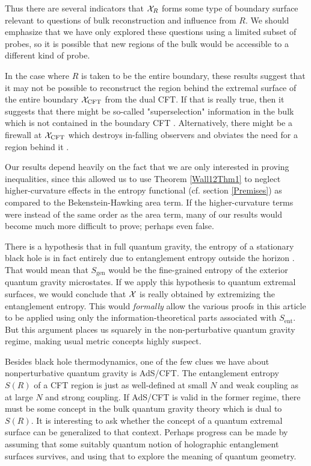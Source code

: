 \documentclass[12pt]{article}
\theoremstyle{remark}
\numberwithin{equation}{section}
\numberwithin{equation}{section}
\begin{document}
Thus there are several indicators that ${\cal X}_R$ forms some type of boundary surface relevant to questions of bulk reconstruction and influence from $R$.  We should emphasize that we have only explored these questions using a limited subset of probes, so it is possible that new regions of the bulk would be accessible to a different kind of probe.

In the case where $R$ is taken to be the entire boundary, these results suggest that it may not be possible to reconstruct the region behind the extremal surface of the entire boundary ${\cal X}_\mathrm{CFT}$ from the dual CFT.  If that is really true, then it suggests that there might be so-called "superselection" information in the bulk which is not contained in the boundary CFT \cite{Freivogel:2005qh, Marolf:2008tx, Marolf:2012xe}.  Alternatively, there might be a firewall at ${\cal X}_\mathrm{CFT}$ which destroys in-falling observers and obviates the need for a region behind it \cite{AMPS, EngelhardtWall}.

Our results depend heavily on the fact that we are only interested in proving inequalities, since this allowed us to use Theorem \ref{Wall12Thm1} to neglect higher-curvature effects in the entropy functional (cf. section \ref{Premises}) as compared to the Bekenstein-Hawking area term.  If the higher-curvature terms were instead of the same order as the area term, many of our results would become much more difficult to prove; perhaps even false.

There is a hypothesis that in full quantum gravity, the entropy of a stationary black hole is in fact entirely due to entanglement entropy outside the horizon \cite{SusskindUglum,Frolov:1993ym, Barvinsky:1994jca,  Frolov:1998vs}.  That would mean that $S_\mathrm{gen}$ would be the fine-grained entropy of the exterior quantum gravity microstates.  If we apply this hypothesis to quantum extremal surfaces, we would conclude that ${\cal X}$ is really obtained by extremizing the entanglement entropy.  This would \emph{formally} allow the various proofs in this article to be applied using only the information-theoretical parts associated with $S_\mathrm{ent}$.  But this argument places us squarely in the non-perturbative quantum gravity regime, making usual metric concepts highly suspect.

Besides black hole thermodynamics, one of the few clues we have about nonperturbative quantum gravity is AdS/CFT.  The entanglement entropy $S(R)$ of a CFT region is just as well-defined at small $N$ and weak coupling as at large $N$ and strong coupling.  If AdS/CFT is valid in the former regime, there must be some concept in the bulk quantum gravity theory which is dual to $S(R)$.  It is interesting to ask whether the concept of a quantum extremal surface can be generalized to that context.  Perhaps progress can be made by assuming that some suitably quantum notion of holographic entanglement surfaces survives, and using that to explore the meaning of  \nolinebreak quantum \nolinebreak geo\nolinebreak\phantom{}metry.
\end{document}
